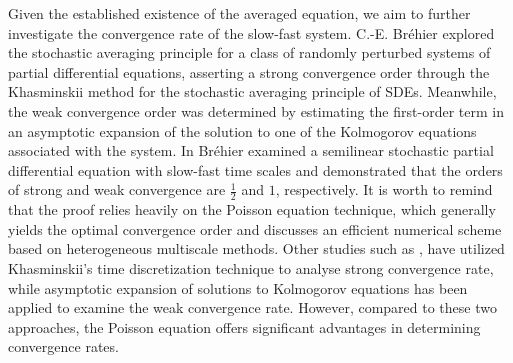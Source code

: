 \documentclass[11pt,reqno]{amsart}
\numberwithin{equation}{section}
\begin{document}
Given the established existence of the averaged equation, we aim to further investigate the convergence rate of the slow-fast system. C.-E. Br\'{e}hier \cite{CEB2} explored the stochastic averaging principle for a class of randomly perturbed systems of partial differential equations, asserting a strong convergence order through the Khasminskii method for the stochastic averaging principle of SDEs. Meanwhile, the weak convergence order was determined by estimating the first-order term in an asymptotic expansion of the solution to one of the Kolmogorov equations associated with the system. In \cite{CEB} Br\'{e}hier examined a semilinear stochastic partial differential equation with slow-fast time scales and demonstrated that the orders of strong and weak convergence are $\frac{1}{2}$ and $1$, respectively.   It is worth to remind that the proof relies heavily on the Poisson equation technique, which generally yields the optimal convergence order and discusses an efficient numerical scheme based on heterogeneous multiscale methods. Other studies such as \cite{DIR,DL,RZK}, have utilized Khasminskii’s time discretization technique to analyse  strong convergence rate, while asymptotic expansion of solutions to Kolmogorov equations has been applied to examine the weak convergence rate. However, compared to these two approaches, the Poisson equation offers significant advantages in determining convergence rates.
\end{document}
